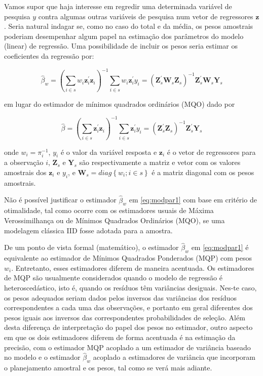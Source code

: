 \documentclass[]{book}
\numberwithin{example}{chapter}
\numberwithin{remark}{chapter}
\numberwithin{definition}{chapter}
\begin{document}
Vamos supor que haja interesse em regredir uma determinada variável de
pesquisa \(y\) contra algumas outras variáveis de pesquisa num vetor de
regressores \(\mathbf{z}\). Seria natural indagar se, como no caso do
total e da média, os pesos amostrais poderiam desempenhar algum papel na
estimação dos parâmetros do modelo (linear) de regressão. Uma
possibilidade de incluir os pesos seria estimar os coeficientes da
regressão por:

\begin{equation}
\widehat{\beta }_{w}=\left(\sum_{i\in s}w_{i}\mathbf{z}_{i}^{\prime }
\mathbf{z}_{i}\right) ^{-1}\sum_{i\in s}w_{i}\mathbf{z}_{i}^{\prime}y_{i}=
\left(\mathbf{Z}_{s}^{\prime }\mathbf{W}_{s}\mathbf{Z}_{s}\right)^{-1}\mathbf{Z}_{s}^{\prime }\mathbf{W}_{s}\mathbf{Y}_{s} 
\label{eq:modpar1}
\end{equation}

em lugar do estimador de mínimos quadrados ordinários (MQO) dado por

\begin{equation}
\widehat{\beta}=\left( \sum_{i\in s}\mathbf{z}_{i}^{\prime }\mathbf{z}_{i}\right)^{-1}\sum_{i\in s}\mathbf{z}_{i}^{\prime }y_{i}=\left(\mathbf{Z}_{s}^{\prime }\mathbf{Z}_{s}\right)^{-1}\mathbf{Z}_{s}^{\prime }\mathbf{Y}_{s}  
\label{eq:modpar2}
\end{equation}

onde \(w_{i}=\pi _{i}^{-1}\), \(y_{i}\) é o valor da variável resposta e
\(\mathbf{z}_{i}\) é o vetor de regressores para a observação \(i\),
\(\mathbf{Z}_{s}\) e \(\mathbf{Y}_{s}\) são respectivamente a matriz e
vetor com os valores amostrais dos \(\mathbf{z}_{i}\) e \(y_{i}\), e
\(\mathbf{W}_{s}=diag\left\{ w_{i};i\in s\right\}\) é a matriz diagonal
com os pesos amostrais.

Não é possível justificar o estimador \(\widehat{\beta }_{w}\) em
\eqref{eq:modpar1} com base em critério de otimalidade, tal como ocorre
com os estimadores usuais de Máxima Verossimilhança ou de Mínimos
Quadrados Ordinários (MQO), se uma modelagem clássica IID fosse adotada
para a amostra.

De um ponto de vista formal (matemático), o estimador
\(\widehat{\beta }_{w}\) em \eqref{eq:modpar1} é equivalente ao estimador
de Mínimos Quadrados Ponderados (MQP) com pesos \(w_{i}\). Entretanto,
esses estimadores diferem de maneira acentuada. Os estimadores de MQP
são usualmente considerados quando o modelo de regressão é
heteroscedástico, isto é, quando os resíduos têm variâncias desiguais.
Nes-te caso, os pesos adequados seriam dados pelos inversos das
variâncias dos resíduos correspondentes a cada uma das observações, e
portanto em geral diferentes dos pesos iguais aos inversos das
correspondentes probabilidades de seleção. Além desta diferença de
interpretação do papel dos pesos no estimador, outro aspecto em que os
dois estimadores diferem de forma acentuada é na estimação da precisão,
com o estimador MQP acoplado a um estimador de variância baseado no
modelo e o estimador \(\widehat{\beta }_{w}\) acoplado a estimadores de
variância que incorporam o planejamento amostral e os pesos, tal como se
verá mais adiante.
\end{document}
